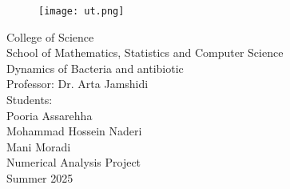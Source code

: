 	\vspace*{\fill}
	\begin{figure}[htp]
		\centering \texttt{[image: ut.png]}
	\end{figure}
	\begin{center}
		\large
		College of Science
		\\
		School of Mathematics, Statistics and Computer Science
		\\
		{\LARGE Dynamics of Bacteria and antibiotic} \\
		\vspace{1cm}
		Professor: Dr. Arta Jamshidi
		\\
		\vspace{1cm}
		Students:\\
		Pooria Assarehha\\
		Mohammad Hossein Naderi\\
		Mani Moradi\\
		\vspace{1cm}
		Numerical Analysis Project
		\\		
		Summer 2025
		\vspace{2cm}
	\end{center}
	\thispagestyle{empty}
	\vspace*{\fill}